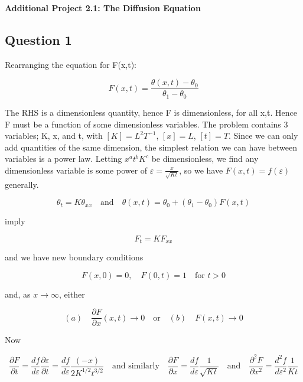 \documentclass[10pt,a4paper]{report}
\begin{document}
\textbf{Additional Project 2.1: The Diffusion Equation}
\thispagestyle{empty}

\newpage

\subsection*{Question 1}

Rearranging the equation for F(x,t):

\begin{equation*}
F(x,t)=\frac{\theta(x,t)- \theta_0}{\theta_1 - \theta_0}  
\end{equation*}

The RHS is a dimensionless quantity, hence F is dimensionless, for all x,t. Hence F must be a function of some dimensionless variables. The problem contains 3 variables; K, x, and t, with $[K]=L^2T^{-1}$, $[x]=L$, $[t]=T$. Since we can only add quantities of the same dimension, the simplest relation we can have between variables is a power law. Letting  $x^a t^b K^c$ be dimensionless, we find any dimensionless variable is some power of $\varepsilon = \frac{x}{\sqrt{Kt}}$, so we have $F(x,t)=f(\varepsilon)$ generally.\par

\begin{equation*}
\theta_t=K\theta_{xx} \quad \text{and} \quad \theta(x,t)=\theta_0+(\theta_1 - \theta_0)F(x,t)
\end{equation*}

imply 

\begin{equation*}
F_t=KF_{xx}
\end{equation*}

and we have new boundary conditions

\begin{equation*}
F(x,0)=0, \quad F(0,t)=1 \quad \text{for } t>0
\end{equation*}

and, as $x \rightarrow \infty$, either

\begin{equation*}
(a) \quad \frac{\partial F}{\partial x}(x,t) \rightarrow 0 \quad \text{or} \quad (b)\quad F(x,t) \rightarrow 0
\end{equation*}

Now 

\begin{equation} \label{*}
\frac{\partial F}{\partial t} = \frac{df}{d\varepsilon}\frac{\partial \varepsilon}{\partial t} = 
\frac{df}{d\varepsilon}\frac{(-x)}{2K^{1/2}t^{3/2}} \quad \text{and similarly} \quad \frac{\partial F}{\partial x}=\frac{df}{d\varepsilon}\frac{1}{\sqrt{Kt}} \quad \text{and} \quad  \frac{\partial^2 F}{\partial x^2}=\frac{d^2f}{d\varepsilon^2}\frac{1}{Kt} \tag{*}
\end{equation}
\end{document}
